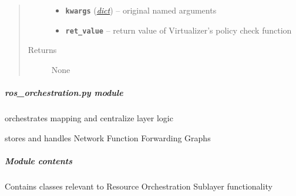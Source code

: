 \documentclass[letterpaper,10pt,english]{sphinxmanual}
\begin{document}
\begin{fulllineitems}
\begin{fulllineitems}
\begin{quote}
\begin{description}
\begin{itemize}
\item {} 
\textbf{\texttt{kwargs}} (\href{https://docs.python.org/2.7/library/stdtypes.html\#dict}{\emph{dict}}) -- original named arguments

\item {} 
\textbf{\texttt{ret\_value}} -- return value of Virtualizer's policy check function

\end{itemize}

\item[{Returns}] \leavevmode
None

\end{description}\end{quote}

\end{fulllineitems}


\end{fulllineitems}



\subparagraph{\emph{ros\_orchestration.py} module}
\label{orchest/ros_orchestration:ros-orchestration-py-module}\label{orchest/ros_orchestration::doc}
{\hyperref[orchest/ros_orchestration:escape.orchest.ros_orchestration.ResourceOrchestrator]{\emph{}}} orchestrates {\hyperref[util/nffg:escape.util.nffg.NFFG]{\emph{}}} mapping and centralize
layer logic

{\hyperref[orchest/ros_orchestration:escape.orchest.ros_orchestration.NFFGManager]{\emph{}}} stores and handles Network Function Forwarding Graphs


\subparagraph{Module contents}
\label{orchest/ros_orchestration:module-contents}\label{orchest/ros_orchestration:module-escape.orchest.ros_orchestration}
Contains classes relevant to Resource Orchestration Sublayer functionality
\end{document}
